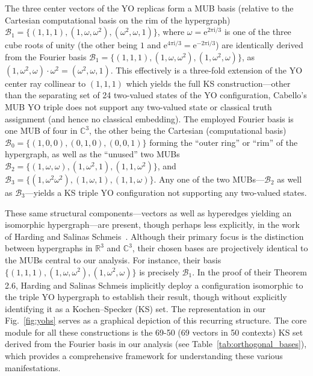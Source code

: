 \documentclass[%
  reprint,
  superscriptaddress,
  showpacs,
  showkeys,
  amsmath,amssymb,
  pra,
  longbibliography,
  floatfix,
  x11names
]{revtex4-2}
\newcommand{\ii}{\mathrm{i}}
\begin{document}
The three center vectors of the YO replicas form a MUB basis (relative to the Cartesian computational basis on the rim of the hypergraph)
$\mathcal{B}_1 = \{(1,1,1), (1,\omega,\omega^2), (\omega^2,\omega,1)\}$,
where $\omega=\mathrm{e}^{2\pi \ii{}/3}$ is one of the three cube roots  of unity (the other being $1$ and $\mathrm{e}^{4\pi \ii{}/3}=\mathrm{e}^{-2\pi \ii{}/3}$)
are identically derived from the Fourier basis
$\mathcal{B}_1 = \{(1,1,1), (1,\omega,\omega^2), (1,\omega^2,\omega)\}$,
as $(1,\omega^2,\omega)\cdot \omega^2=(\omega^2,\omega,1)$.
This effectively is a three-fold extension of the YO center ray collinear to $(1,1,1)$
which yields the full KS construction---other than the separating set of 24 two-valued states of the YO configuration,
Cabello's MUB YO triple does not support any two-valued state or classical truth assignment (and hence no classical embedding).
The employed Fourier basis is one MUB of four in  $\mathbb{C}^3$, the other being
the Cartesian (computational basis)
$\mathcal{B}_0= \{(1,0,0),(0,1,0),(0,0,1)\}$ forming the ``outer ring'' or ``rim'' of the hypergraph, as well as the ``unused'' two MUBs
$\mathcal{B}_2=\{(1,\omega,\omega),(1,\omega^2,1),(1,1,\omega^2)\}$, and
$\mathcal{B}_3=\{(1,\omega^2\omega^2),(1,\omega,1),(1,1,\omega)\}$.
Any one of the two MUBs---$\mathcal{B}_2$ as well as $\mathcal{B}_3$---yields a KS triple YO configuration not supporting any two-valued states.


These same structural components---vectors as well as hyperedges yielding an isomorphic hypergraph---are present, though perhaps less explicitly,
in the work of Harding and Salinas Schmeis~\cite[Fig.~2]{harding2025remarksIJTP}.
Although their primary focus is the distinction between hypergraphs in $\mathbb{R}^3$ and $\mathbb{C}^3$,
their chosen bases are projectively identical to the MUBs central to our analysis.
For instance, their basis $\{(1,1,1), (1,\omega,\omega^2), (1,\omega^2,\omega)\}$ is precisely $\mathcal{B}_1$.
In the proof of their Theorem 2.6, Harding and Salinas Schmeis implicitly deploy a configuration isomorphic to the triple YO hypergraph to establish their result,
though without explicitly identifying it as a Kochen--Specker (KS) set.
The representation in our Fig.~\ref{fig:yohs} serves as a graphical depiction of this recurring structure.
The core module for all these constructions is the 69-50 (69 vectors in 50 contexts) KS set derived from the Fourier basis in our analysis
(see Table~\ref{tab:orthogonal_bases}),
which provides a comprehensive framework for understanding these various manifestations.
\end{document}
